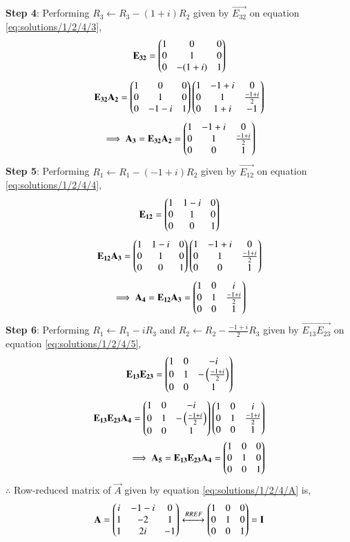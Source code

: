 \textbf{Step 4}: Performing $R_3\leftarrow R_3-(1+i)R_2$ given by $\vec{E_{32}}$ on equation \eqref{eq:solutions/1/2/4/3},
\begin{align}
\mathbf{E_{32}} = \begin{pmatrix}1&0&0\\0&1&0\\0&-(1+i)&1\end{pmatrix}
\end{align}
\begin{align}
\mathbf{E_{32}A_2} = \begin{pmatrix}1&0&0\\0&1&0\\0&-1-i&1\end{pmatrix}\begin{pmatrix}1&-1+i&0\\0&1&\frac{-1+i}{2}\\0&1+i&-1\end{pmatrix}
\end{align}
\begin{align}
\implies \mathbf{A_3}=\mathbf{E_{32}A_2} = \begin{pmatrix}1&-1+i&0\\0&1&\frac{-1+i}{2}\\0&0&1\end{pmatrix}\label{eq:solutions/1/2/4/4}
\end{align}
\textbf{Step 5}: Performing $R_1\leftarrow R_1-(-1+i)R_2$ given by $\vec{E_{12}}$ on equation \eqref{eq:solutions/1/2/4/4},
\begin{align}
\mathbf{E_{12}} = \begin{pmatrix}1&1-i&0\\0&1&0\\0&0&1\end{pmatrix}
\end{align}
\begin{align}
\mathbf{E_{12}A_3} = \begin{pmatrix}1&1-i&0\\0&1&0\\0&0&1\end{pmatrix}\begin{pmatrix}1&-1+i&0\\0&1&\frac{-1+i}{2}\\0&0&1\end{pmatrix}
\end{align}
\begin{align}
\implies \mathbf{A_4} = \mathbf{E_{12}A_3} = \begin{pmatrix}1&0&i\\0&1&\frac{-1+i}{2}\\0&0&1\end{pmatrix}\label{eq:solutions/1/2/4/5}
\end{align}
\textbf{Step 6}: Performing $R_1\leftarrow R_1-iR_3$ and $R_2\leftarrow R_2-\frac{-1+i}{2}R_3$ given by $\vec{E_{13}E_{23}}$ on equation \eqref{eq:solutions/1/2/4/5},
\begin{align}
\mathbf{E_{13}E_{23}} = \begin{pmatrix}1&0&-i\\0&1&-\left(\frac{-1+i}{2}\right)\\0&0&1\end{pmatrix}
\end{align}
\begin{align}
\mathbf{E_{13}E_{23}A_4} = \begin{pmatrix}1&0&-i\\0&1&-\left(\frac{-1+i}{2}\right)\\0&0&1\end{pmatrix}\begin{pmatrix}1&0&i\\0&1&\frac{-1+i}{2}\\0&0&1\end{pmatrix}\\
\implies \mathbf{A_5} = \mathbf{E_{13}E_{23}A_4} = \begin{pmatrix}1&0&0\\0&1&0\\0&0&1\end{pmatrix} 
\end{align}
$\therefore$ Row-reduced matrix of $\vec{A}$ given by equation \eqref{eq:solutions/1/2/4/A} is,
\begin{align}
\mathbf{A} = \begin{pmatrix}i&-1-i&0\\1&-2&1\\1&2i&-1\end{pmatrix}\xleftrightarrow[]{RREF}\begin{pmatrix}1&0&0\\0&1&0\\0&0&1\end{pmatrix} = \mathbf{I}
\end{align}
